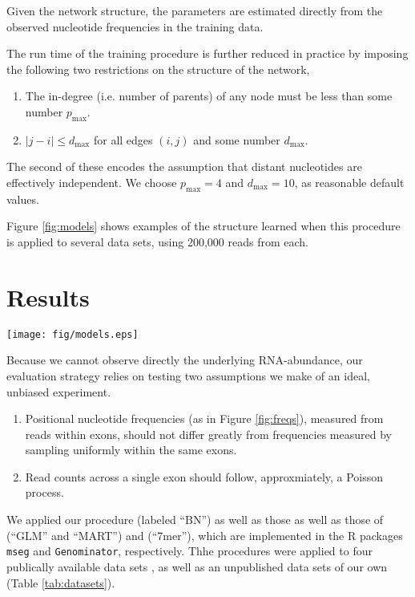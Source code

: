 \documentclass{bioinfo}
\begin{document}
Given the network structure, the parameters are estimated directly from the
observed nucleotide frequencies in the training data.

The run time of the training procedure is further reduced in practice by imposing the
following two restrictions on the structure of the network,
\begin{enumerate}
\item The in-degree (i.e. number of parents) of any node must be less than some
number $p_{\text{max}}$.
\item $|j - i| \le d_{\text{max}}$ for all edges $(i,j)$ and some number $d_{\text{max}}$.
\end{enumerate}
The second of these encodes the assumption that distant nucleotides are
effectively independent. We choose $p_{\text{max}} = 4$ and $d_{\text{max}} =
10$, as reasonable default values.

Figure \ref{fig:models} shows examples of the structure learned when this
procedure is applied to several data sets, using 200,000 reads from each.


\section{Results}

\begin{figure*}
\centerline{\texttt{[image: fig/models.eps]}}
\caption{Blah blah blah.}
\label{fig:models}
\end{figure*}


Because we cannot observe directly the underlying RNA-abundance, our evaluation
strategy relies on testing two assumptions we make of an ideal, unbiased experiment.
\begin{enumerate}
\item Positional nucleotide frequencies (as in Figure \ref{fig:freqs}), measured
from reads within exons, should not differ greatly from frequencies measured by
sampling uniformly within the same exons.
\item Read counts across a single exon should follow, approxmiately, a Poisson
process.
\end{enumerate}

We applied our procedure (labeled ``BN'') as well as those as well as those of
\citet{Li2010} (``GLM'' and ``MART'') and \citet{Hansen2010} (``7mer''), which
are implemented in the R packages \texttt{mseg} and \texttt{Genominator},
respectively. Thhe procedures were applied to four publically available data
sets \citep{Bullard2010, Mortazavi2008, Trapnell2010, Wetterbom2010}, as well as
an unpublished data sets of our own (Table \ref{tab:datasets}).
\end{document}
